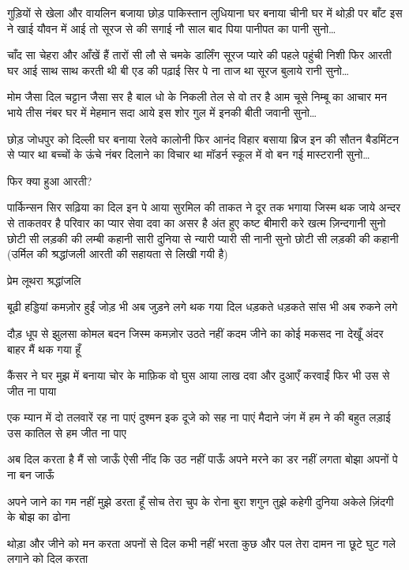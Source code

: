 गुड़ियों से खेला और वायलिन बजाया
छोड़ पाकिस्तान लुधियाना घर बनाया
चीनी घर में थोड़ी पर बाँट इस ने खाई
यौवन में आई तो सूरज से की सगाई
नौ साल बाद पिया पानीपत का पानी
सुनो…





चाँद सा चेहरा और आँखें हैं तारों सी
लौ से चमके डार्लिंग सूरज प्यारे की
पहले पहुंची निशी फिर आरती घर आई
साथ साथ करती थी बी एड की पढ़ाई
सिर पे ना ताज था सूरज बुलाये रानी
सुनो…

मोम जैसा दिल चट्टान जैसा सर है
बाल धो के निकली तेल से वो तर है
आम चूसे निम्बू का आचार मन भाये
तीस नंबर घर में मेहमान सदा आये
इस शोर गुल में इनकी बीती जवानी
सुनो…





छोड़ जोधपुर को दिल्ली घर बनाया
रेलवे कालोनी फिर आनंद विहार बसाया
ब्रिज इन की सौतन बैडमिंटन से प्यार था
बच्चों के ऊंचे नंबर दिलाने का विचार था
मॉडर्न स्कूल में वो बन गई मास्टरानी
सुनो…





फिर क्या हुआ आरती?

पार्किन्सन सिर सढ़िया का दिल इन पे आया
सुरमिल की ताकत ने दूर तक भगाया
जिस्म थक जाये अन्दर से ताकतवर है
परिवार का प्यार सेवा दवा का असर है
अंत हुए कष्ट बीमारी करे खत्म ज़िन्दगानी
सुनो छोटी सी लड़की की लम्बी कहानी
सारी दुनिया से न्यारी प्यारी सी नानी
सुनो छोटी सी लड़की की कहानी
(उर्मिल की श्रद्धांजली आरती की सहायता से
लिखी गयी है)

प्रेम लूथरा श्रद्धांजलि

बूढ़ी हड्डियां कमज़ोर हुईं
जोड़ भी अब जुड़ने लगे
थक गया दिल धड़कते धड़कते
सांस भी अब रुकने लगे





दौड़ धूप से झुलसा कोमल बदन
जिस्म कमज़ोर उठते नहीं कदम
जीने का कोई मकसद ना देखूँ
अंदर बाहर मैं थक गया हूँ

कैंसर ने घर मुझ में बनाया
चोर के माफ़िक वो घुस आया
लाख दवा और दुआएँ करवाईं
फिर भी उस से जीत ना पाया


एक म्यान में दो तलवारें रह ना पाएं
दुश्मन इक दूजे को सह ना पाएं
मैदाने जंग में हम ने की बहुत लड़ाई
उस कातिल से हम जीत ना पाए


अब दिल करता है मैं सो जाऊँ
ऐसी नींद कि उठ नहीं पाऊँ
अपने मरने का डर नहीं लगता
बोझा अपनों पे ना बन जाऊँ

अपने जाने का गम नहीं मुझे
डरता हूँ सोच तेरा चुप के रोना
बुरा शगुन तुझे कहेगी दुनिया
अकेले ज़िंदगी के बोझ का ढोना

थोड़ा और जीने को मन करता
अपनों से दिल कभी नहीं भरता
कुछ और पल तेरा दामन ना छूटे
घुट गले लगाने को दिल करता


